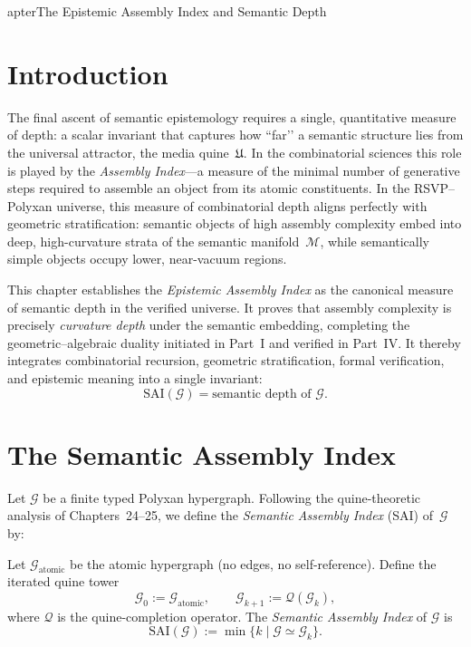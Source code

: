 apter{The Epistemic Assembly Index and Semantic Depth}
\label{ch:epistemic-assembly-index}

\section{Introduction}

The final ascent of semantic epistemology requires a single, quantitative
measure of depth: a scalar invariant that captures how ``far’’ a semantic
structure lies from the universal attractor, the media quine~$\mathfrak{U}$.
In the combinatorial sciences this role is played by the
\emph{Assembly Index}---a measure of the minimal number of generative steps
required to assemble an object from its atomic constituents.
In the RSVP--Polyxan universe, this measure of combinatorial depth
aligns perfectly with geometric stratification:
semantic objects of high assembly complexity embed into deep, high-curvature
strata of the semantic manifold~$\mathcal{M}$, while semantically simple
objects occupy lower, near-vacuum regions.

This chapter establishes the \emph{Epistemic Assembly Index} as the
canonical measure of semantic depth in the verified universe.
It proves that assembly complexity is precisely \emph{curvature depth} under
the semantic embedding, completing the geometric--algebraic duality initiated
in Part~I and verified in Part~IV.
It thereby integrates combinatorial recursion, geometric stratification,
formal verification, and epistemic meaning into a single invariant:
\[
\mathrm{SAI}(\mathcal{G})=\text{semantic depth of }\mathcal{G}.
\]



\section{The Semantic Assembly Index}

Let $\mathcal{G}$ be a finite typed Polyxan hypergraph.
Following the quine-theoretic analysis of Chapters~24--25, we define the
\emph{Semantic Assembly Index} (SAI) of~$\mathcal{G}$ by:

\begin{definition}
\label{def:sai}
Let $\mathcal{G}_{\mathrm{atomic}}$ be the atomic hypergraph (no edges, no
self-reference).  Define the iterated quine tower
\[
\mathcal{G}_0 := \mathcal{G}_{\mathrm{atomic}}, \qquad
\mathcal{G}_{k+1} := \mathcal{Q}(\mathcal{G}_k),
\]
where $\mathcal{Q}$ is the quine-completion operator.
The \emph{Semantic Assembly Index} of $\mathcal{G}$ is
\[
\mathrm{SAI}(\mathcal{G})
  := \min\{ k \;|\; \mathcal{G}\simeq\mathcal{G}_k\}.
\]
\end{definition}

